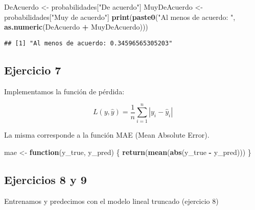 \documentclass[
]{article}
\newenvironment{Shaded}{\begin{snugshade}}{\end{snugshade}}
\newcommand{\ControlFlowTok}[1]{\textcolor[rgb]{0.13,0.29,0.53}{\textbf{#1}}}
\newcommand{\FunctionTok}[1]{\textcolor[rgb]{0.13,0.29,0.53}{\textbf{#1}}}
\newcommand{\NormalTok}[1]{#1}
\newcommand{\OtherTok}[1]{\textcolor[rgb]{0.56,0.35,0.01}{#1}}
\newcommand{\SpecialCharTok}[1]{\textcolor[rgb]{0.81,0.36,0.00}{\textbf{#1}}}
\newcommand{\StringTok}[1]{\textcolor[rgb]{0.31,0.60,0.02}{#1}}
\begin{document}
\begin{Shaded}
\begin{Highlighting}[]
\NormalTok{DeAcuerdo }\OtherTok{\textless{}{-}}\NormalTok{ probabilidades[}\StringTok{"De acuerdo"}\NormalTok{]}
\NormalTok{MuyDeAcuerdo }\OtherTok{\textless{}{-}}\NormalTok{ probabilidades[}\StringTok{"Muy de acuerdo"}\NormalTok{]}
\FunctionTok{print}\NormalTok{(}\FunctionTok{paste0}\NormalTok{(}\StringTok{"Al menos de acuerdo: "}\NormalTok{, }\FunctionTok{as.numeric}\NormalTok{(DeAcuerdo }\SpecialCharTok{+}\NormalTok{ MuyDeAcuerdo)))}
\end{Highlighting}
\end{Shaded}

\begin{verbatim}
## [1] "Al menos de acuerdo: 0.34596565305203"
\end{verbatim}

\subsection{Ejercicio 7}\label{ejercicio-7}

Implementamos la función de pérdida:

\[
L(y, \hat{y}) = \frac{1}{n} \sum_{i=1}^{n} \left| y_i - \hat{y}_i \right|
\]

La misma corresponde a la función MAE (Mean Absolute Error).

\begin{Shaded}
\begin{Highlighting}[]
\NormalTok{mae }\OtherTok{\textless{}{-}} \ControlFlowTok{function}\NormalTok{(y\_true, y\_pred) \{}
  \FunctionTok{return}\NormalTok{(}\FunctionTok{mean}\NormalTok{(}\FunctionTok{abs}\NormalTok{(y\_true }\SpecialCharTok{{-}}\NormalTok{ y\_pred)))}
\NormalTok{\}}
\end{Highlighting}
\end{Shaded}

\subsection{Ejercicios 8 y 9}\label{ejercicios-8-y-9}

Entrenamos y predecimos con el modelo lineal truncado (ejercicio 8)
\end{document}
